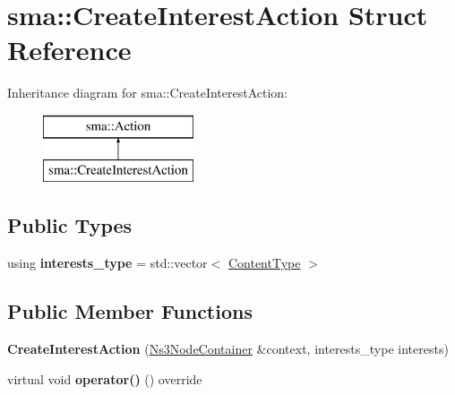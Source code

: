 \hypertarget{structsma_1_1CreateInterestAction}{\section{sma\-:\-:Create\-Interest\-Action Struct Reference}
\label{structsma_1_1CreateInterestAction}
}
Inheritance diagram for sma\-:\-:Create\-Interest\-Action\-:\begin{figure}[H]
\begin{center}
\leavevmode
\includegraphics[height=2.000000cm]{structsma_1_1CreateInterestAction}
\end{center}
\end{figure}
\subsection*{Public Types}
\begin{DoxyCompactItemize}
\item 
\hypertarget{structsma_1_1CreateInterestAction_ab682f6a49bf3b6d659f127ba070d48f6}{using {\bfseries interests\-\_\-type} = std\-::vector$<$ \hyperlink{structsma_1_1ContentType}{Content\-Type} $>$}\label{structsma_1_1CreateInterestAction_ab682f6a49bf3b6d659f127ba070d48f6}

\end{DoxyCompactItemize}
\subsection*{Public Member Functions}
\begin{DoxyCompactItemize}
\item 
\hypertarget{structsma_1_1CreateInterestAction_ad9308248a7c5259da318b3a048ab1419}{{\bfseries Create\-Interest\-Action} (\hyperlink{classsma_1_1Ns3NodeContainer}{Ns3\-Node\-Container} \&context, interests\-\_\-type interests)}\label{structsma_1_1CreateInterestAction_ad9308248a7c5259da318b3a048ab1419}

\item 
\hypertarget{structsma_1_1CreateInterestAction_a52a88f8017244c251b84134ece0cc43c}{virtual void {\bfseries operator()} () override}\label{structsma_1_1CreateInterestAction_a52a88f8017244c251b84134ece0cc43c}

\end{DoxyCompactItemize}
